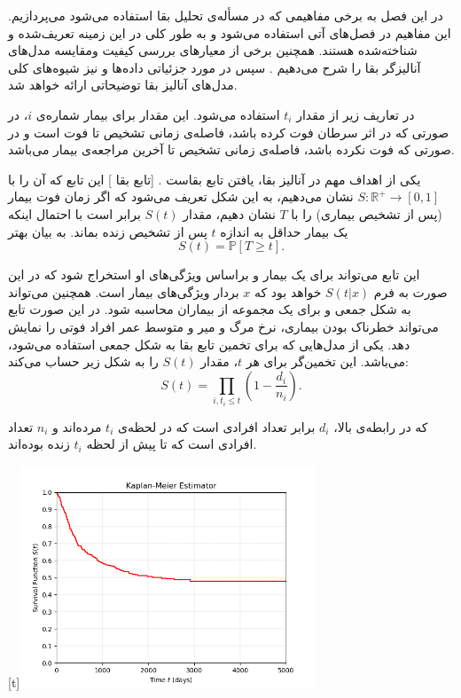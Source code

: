 

در این فصل به برخی مفاهیمی که در مسأله‌ی تحلیل بقا استفاده می‌شود می‌پردازیم. این مفاهیم در فصل‌های آتی استفاده می‌شود و به طور کلی در این زمینه تعریف‌شده و شناخته‌شده هستند. همچنین برخی از معیارهای بررسی کیفیت ومقایسه مدل‌های آنالیزگر بقا را شرح می‌دهیم . سپس در مورد جزئیاتی داده‌‌ها و نیز شیوه‌های کلی مدل‌های آنالیز بقا توضیحاتی ارائه خواهد شد.


در تعاریف زیر از مقدار $t_i$ استفاده می‌شود. این مقدار برای بیمار شماره‌ی $i$، در صورتی که در اثر سرطان فوت کرده باشد، فاصله‌ی زمانی تشخیص تا فوت است و در صورتی که فوت نکرده باشد، فاصله‌ی زمانی تشخیص تا آخرین مراجعه‌‌ی بیمار می‌باشد.

یکی از اهداف مهم در آنالیز بقا، یافتن تابع بقاست .
[تابع بقا ]
این تابع که آن را با
$S: \mathbb{R}^{+} \rightarrow \left[0, 1\right]$
نشان می‌دهیم، به این شکل تعریف می‌شود که اگر زمان فوت بیمار (پس از تشخیص بیماری) را با $T$ نشان دهیم، مقدار $S(t)$ برابر است با احتمال اینکه یک بیمار حداقل به اندازه $t$ پس از تشخیص زنده بماند. به بیان بهتر
$$S(t) = \mathbb{P}\left[T \geq t\right].$$

این تابع می‌تواند برای یک بیمار و بر‌اساس ویژگی‌های او استخراج شود که در این صورت به فرم $S(t|x)$ خواهد بود که $x$ بردار ویژگی‌های بیمار است. همچنین می‌تواند به شکل جمعی و برای یک مجموعه از بیماران محاسبه شود. در این صورت تابع می‌تواند خطرناک بودن بیماری، نرخ مرگ و میر و متوسط عمر افراد فوتی را نمایش دهد. یکی از مدل‌‌هایی که برای تخمین تابع بقا به شکل جمعی استفاده می‌شود،  می‌باشد. این تخمین‌گر برای هر $t$، مقدار $S(t)$ را به شکل زیر حساب می‌کند:
$$S(t) = \prod_{i, t_i \leq t} (1-\frac{d_i}{n_i}).$$

که در رابطه‌ی بالا، $d_i$ برابر تعداد افرادی است که در لحظه‌ی $t_i$ مرده‌اند و $n_i$ تعداد افرادی است که تا پیش از لحظه $t_i$ زنده بوده‌اند.

[t]\centering\includegraphics[width=250pt]{figs/kaplan-meier-estimator}

